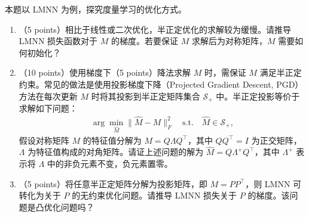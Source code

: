 \documentclass[answers]{exam}  %
\begin{document}
\begin{questions}
\begin{parts}
\vspace{\baselineskip}本题以 LMNN 为例，探究度量学习的优化方式。
\begin{enumerate}
    \item （5 points）相比于线性或二次优化，半正定优化的求解较为缓慢。请推导 LMNN 损失函数对于 $M$ 的梯度。若要保证 $M$ 求解后为对称矩阵，$M$ 需要如何初始化？
    \item （10 points）使用梯度下（5 points）降法求解 $M$ 时，需保证 $M$ 满足半正定约束。常见的做法是使用投影梯度下降（Projected Gradient Descent, PGD）方法在每次更新 $M$ 时将其投影到半正定矩阵集合 $\mathcal{S}_+$ 中。半正定投影等价于求解如下问题：
    \begin{align}
        \arg\min_{\hat{M}} \|\hat{M} - M\|_F^2 \quad \text{s.t.} \quad \hat{M} \in \mathcal{S}_+,
    \end{align}
    假设对称矩阵 $M$ 的特征值分解为 $M = Q \Lambda Q^\top$，其中 $Q Q^\top = I$ 为正交矩阵，$\Lambda$ 为特征值构成的对角矩阵。请证上述问题的解为 $\hat{M} = Q {\Lambda}^{+} Q^\top$，其中 ${\Lambda}^{+}$ 表示将 $\Lambda$ 中的非负元素不变，负元素置零。
    \item （5 points）将任意半正定矩阵分解为投影矩阵，即 $M = P P^\top$，则 LMNN 可转化为关于 $P$ 的无约束优化问题。请推导 LMNN 损失关于 $P$ 的梯度。该问题是凸优化问题吗？
\end{enumerate}
\end{parts}

\begin{solution}
\begin{parts}
	\part
	\part
\end{parts}
\end{solution}

\end{questions}
\end{document}
